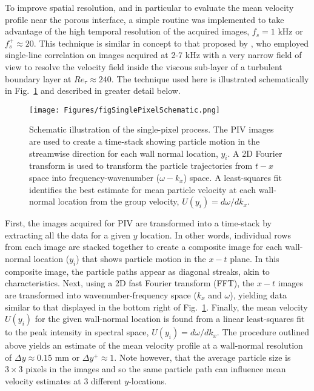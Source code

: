 \documentclass[letterpaper,11pt]{article}
\begin{document}
To improve spatial resolution, and in particular to evaluate the mean velocity profile near the porous interface, a simple routine was implemented to take advantage of the high temporal resolution of the acquired images, $f_s = 1$ kHz or $f_s^+ \approx 20$. This technique is similar in concept to that proposed by \citet{willert2015high}, who employed single-line correlation on images acquired at 2-7 kHz with a very narrow field of view to resolve the velocity field inside the viscous sub-layer of a turbulent boundary layer at $Re_\tau \approx 240$.  The technique used here is illustrated schematically in Fig.~\ref{fig:single} and described in greater detail below. 

\begin{figure}
\centering
\texttt{[image: Figures/figSinglePixelSchematic.png]}
\caption{Schematic illustration of the single-pixel process. The PIV images are used to create a time-stack showing particle motion in the streamwise direction for each wall normal location, $y_i$. A 2D Fourier transform is used to transform the particle trajectories from $t-x$ space into frequency-wavenumber ($\omega-k_x$) space. A least-squares fit identifies the best estimate for mean particle velocity at each wall-normal location from the group velocity, $U(y_i) = d\omega/d k_x$.}
\label{fig:single}
\end{figure}

First, the images acquired for PIV are transformed into a time-stack by extracting all the data for a given $y$ location.  In other words, individual rows from each image are stacked together to create a composite image for each wall-normal location ($y_i$) that shows particle motion in the $x-t$ plane. In this composite image, the particle paths appear as diagonal streaks, akin to characteristics. Next, using a 2D fast Fourier transform (FFT), the $x-t$ images are transformed into wavenumber-frequency space ($k_x$ and $\omega$), yielding data similar to that displayed in the bottom right of Fig.~\ref{fig:single}. Finally, the mean velocity $U(y_i)$ for the given wall-normal location is found from a linear least-squares fit to the peak intensity in spectral space, $U(y_i)=d\omega/dk_x$. The procedure outlined above yields an estimate of the mean velocity profile at a wall-normal resolution of $\Delta y \approx 0.15$ mm or $\Delta y^+ \approx 1$.  Note however, that the average particle size is $3\times3$ pixels in the images and so the same particle path can influence mean velocity estimates at 3 different $y$-locations. 
\end{document}
